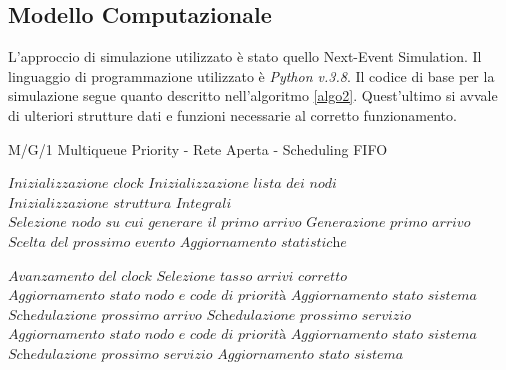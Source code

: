 \documentclass{article}
\begin{document}
\subsection{Modello Computazionale}
L’approccio di simulazione utilizzato è stato quello Next-Event Simulation. Il linguaggio di programmazione utilizzato è \textit{Python v.3.8}.
Il codice di base per la simulazione segue quanto descritto nell'algoritmo \ref{algo2}. Quest'ultimo si avvale di ulteriori strutture dati e funzioni necessarie al corretto funzionamento.

\begin{algorithm}[H]
\caption{M/G/1 Multiqueue Priority - Rete Aperta - Scheduling FIFO}\label{algo2}
\begin{algorithmic}[1]
\State $\textit{Inizializzazione clock}$
\State $\textit{Inizializzazione lista dei nodi}$
\State $\textit{Inizializzazione struttura Integrali}$
\State $\textit{Selezione nodo su cui generare il primo arrivo}$
\State $\textit{Generazione primo arrivo}$
  \State $\textit{Scelta del prossimo evento}$
      \State $\textit{Aggiornamento statistiche}$
    \EndIf

  \EndFor
  \State $\textit{Avanzamento del clock}$
   
      \State $\textit{Selezione tasso arrivi corretto}$
    \EndIf
    \State $\textit{Aggiornamento stato nodo e code di priorità}$ 
    \State $\textit{Aggiornamento stato sistema}$
    \State $\textit{Schedulazione prossimo arrivo}$
      \State $\textit{Schedulazione prossimo servizio}$
    \EndIf
  \Else  {}
    \State $\textit{Aggiornamento stato nodo e code di priorità}$ 
      \State $\textit{Aggiornamento stato sistema}$
    \EndIf
      \State $\textit{Schedulazione prossimo servizio}$
    \EndIf
        \State $\textit{Aggiornamento stato sistema}$
      \EndIf
    \EndIf
  \EndIf
\EndWhile
\EndProcedure
\end{algorithmic}
\end{algorithm}
\end{document}
